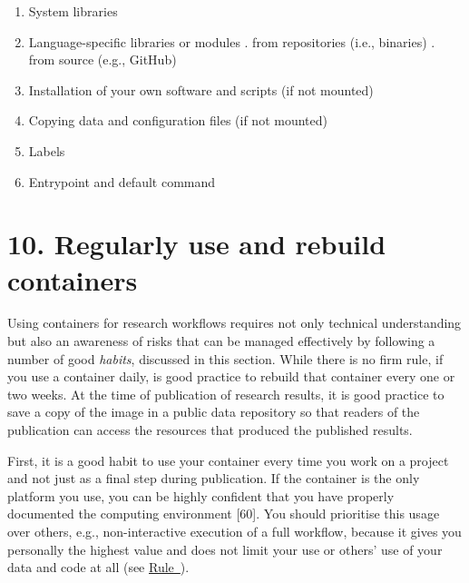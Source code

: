 \documentclass[10pt,letterpaper]{article}
\providecommand{\tightlist}{%
  \setlength{\itemsep}{0pt}\setlength{\parskip}{0pt}}
\begin{document}
\begin{enumerate}
\def\labelenumi{\arabic{enumi}.}
\tightlist
\item
  System libraries
\item
  Language-specific libraries or modules \newline {}. from
  repositories (i.e., binaries) \newline {}. from source (e.g.,
  GitHub)
\item
  Installation of your own software and scripts (if not mounted)
\item
  Copying data and configuration files (if not mounted)
\item
  Labels
\item
  Entrypoint and default command
\end{enumerate}

\hypertarget{regularly-use-and-rebuild-containers}{%
\section*{10. Regularly use and rebuild
containers}\label{regularly-use-and-rebuild-containers}}

  \label{rule:usage} 

Using containers for research workflows requires not only technical
understanding but also an awareness of risks that can be managed
effectively by following a number of good \emph{habits}, discussed in
this section. While there is no firm rule, if you use a container daily,
is good practice to rebuild that container every one or two weeks. At
the time of publication of research results, it is good practice to save
a copy of the image in a public data repository so that readers of the
publication can access the resources that produced the published
results.

First, it is a good habit to use your container every time you work on a
project and not just as a final step during publication. If the
container is the only platform you use, you can be highly confident that
you have properly documented the computing environment {[}60{]}. You
should prioritise this usage over others, e.g., non-interactive
execution of a full workflow, because it gives you personally the
highest value and does not limit your use or others' use of your data
and code at all (see
\hyperref[{rule:interactive}]{Rule~}).
\end{document}

